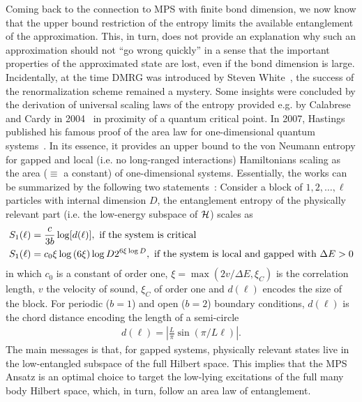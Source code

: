 Coming back to the connection to MPS with finite bond dimension, we now know that the upper bound restriction of the entropy limits the available entanglement of the approximation.
This, in turn, does not provide an explanation why such an approximation should not ``go wrong quickly'' in a sense that the important properties of the approximated state are lost, even if the bond dimension is large.
Incidentally, at the time DMRG was introduced by Steven White~\cite{White1992}, the success of the renormalization scheme remained a mystery.
Some insights were concluded by the derivation of universal scaling laws of the entropy provided e.g. by Calabrese and Cardy in 2004~\cite{Calabrese2004} in proximity of a quantum critical point.
In 2007, Hastings published his famous proof of the area law for one-dimensional quantum systems~\cite{Hastings2007}.
In its essence, it provides an upper bound to the von Neumann entropy for gapped and local (i.e. no long-ranged interactions) Hamiltonians scaling as the area ($\equiv$ a constant) of one-dimensional systems.
Essentially, the works can be summarized by the following two statements~\cite{Eisert2010}:
Consider a block of $1,2,\dots,\ell$ particles with internal dimension $D$, the entanglement entropy of the physically relevant part (i.e. the low-energy subspace of $\mathcal{H}$) scales as
\begin{align}
    S_1(\ell) &= \frac c{3b}\log[d(\ell)],\text{ if the system is critical}\\
    S_1(\ell) &= c_0\xi\log\left( 6\xi \right)\log D2^{6\xi\log D},\text{ if the system is local and gapped with $\Delta E>0$}
\end{align}
in which $c_0$ is a constant of order one, $\xi=\max(2v/\Delta E,\xi_C)$ is the correlation length, $v$ the velocity of sound, $\xi_C$ of order one and $d(\ell)$ encodes the size of the block.
For periodic ($b=1$) and open ($b=2$) boundary conditions, $d(\ell)$ is the chord distance encoding the length of a semi-circle
\begin{align}
    d(\ell) = \left|\frac L\pi\sin(\pi/L\ell)\right|.
\end{align}
The main messages is that, for gapped systems, physically relevant states live in the low-entangled subspace of the full Hilbert space.
This implies that the MPS Ansatz is an optimal choice to target the low-lying excitations of the full many body Hilbert space, which, in turn, follow an area law of entanglement.
%
%
